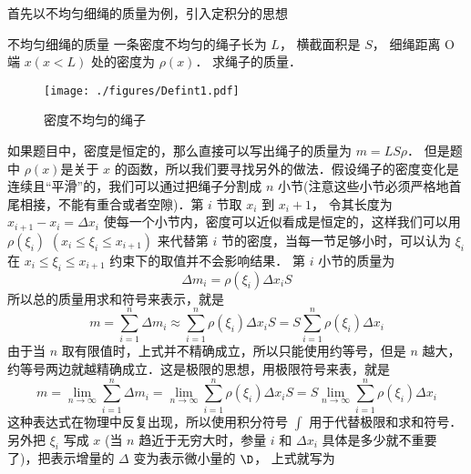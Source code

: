 

首先以不均匀细绳的质量为例，引入定积分的思想

\begin{exam}{不均匀细绳的质量}\label{DefInt_ex1}
一条密度不均匀的绳子长为 $L$， 横截面积是 $S$， 细绳距离 O 端 $x (x<L) $ 处的密度为 $\rho(x)$． 求绳子的质量．


\begin{figure}[h]
\centering
\texttt{[image: ./figures/Defint1.pdf]}
\caption{密度不均匀的绳子}
\end{figure}



如果题目中，密度是恒定的，那么直接可以写出绳子的质量为 $m = LS\rho$． 但是题中 $\rho(x)$是关于 $x$ 的函数，所以我们要寻找另外的做法．假设绳子的密度变化是连续且“平滑”的，我们可以通过把绳子分割成 $n$ 小节(注意这些小节必须严格地首尾相接，不能有重合或者空隙)．第 $i$ 节取 $x_i$ 到 $x_i +1$， 令其长度为 $x_{i + 1} - {x_i} = \Delta x_i$ 使每一个小节内，密度可以近似看成是恒定的，这样我们可以用 $\rho(\xi _i)\,\, (x_i \le \xi _i \le x_{i + 1})$ 来代替第 $i$ 节的密度，当每一节足够小时，可以认为 ${\xi _i}$ 在 ${x_i} \le {\xi _i} \le {x_{i + 1}}$ 约束下的取值并不会影响结果．
第 $i$ 小节的质量为
\begin{equation}
\Delta {m_i} = \rho \left( {{\xi _i}} \right)\Delta {x_i}S 
\end{equation}
所以总的质量用求和符号来表示，就是
\begin{equation}
m = \sum\limits_{i = 1}^n {\Delta {m_i}}  \approx \sum\limits_{i = 1}^n {\rho \left( {{\xi _i}} \right)\Delta {x_i}S  }  = S \sum\limits_{i = 1}^n {\rho \left( {{\xi _i}} \right)\Delta {x_i} } 
\end{equation}
由于当 $n$ 取有限值时，上式并不精确成立，所以只能使用约等号，但是 $n$ 越大，约等号两边就越精确成立．这是极限的思想，用极限符号来表，就是
\begin{equation}
m = \mathop {\lim }\limits_{n \to \infty } \sum\limits_{i = 1}^n {\Delta {m_i}}  = \mathop {\lim }\limits_{n \to \infty } \sum\limits_{i = 1}^n {\rho \left( {{\xi _i}} \right)\Delta {x_i}S  }  = S   \mathop {\lim }\limits_{n \to \infty } \sum\limits_{i = 1}^n {\rho \left( {{\xi _i}} \right)\Delta {x_i} } 
\end{equation}
这种表达式在物理中反复出现，所以使用积分符号 $\int {} $ 用于代替极限和求和符号．另外把 ${\xi _i}$ 写成 $x$ (当 $n$ 趋近于无穷大时，参量 $i$ 和 $\Delta {x_i}$ 具体是多少就不重要了)，把表示增量的 $\Delta $ 变为表示微小量的 $\D$， 上式就写为

\end{exam}
